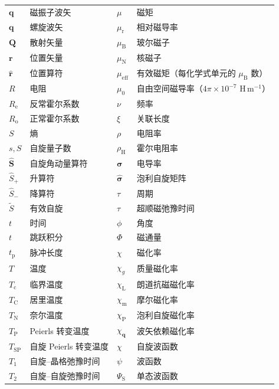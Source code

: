 \begin{center}
\begin{small}
\begin{tabular}{ll@{\hspace{3em}}ll}
\toprule
$\mathbf{q}$ & 磁振子波矢 & $\mu$ & 磁矩\\
$\mathbf{q}$ & 螺旋波矢 & $\mu_{\mathrm{r}}$ & 相对磁导率\\
$\mathbf{Q}$ & 散射矢量 & $\mu_{\mathrm{B}}$ & 玻尔磁子\\
$\mathbf{r}$ & 位置矢量 & $\mu_{\mathrm{N}}$ & 核磁子\\
$\hat{\mathbf{r}}$ & 位置算符 & $\mu_{\mathrm{eff}}$ & 有效磁矩（每化学式单元的 $\mu_{\mathrm{B}}$ 数）\\
$R$ & 电阻 & $\mu_0$ & 自由空间磁导率（$4\pi\times10^{-7}$ H\,m$^{-1}$）\\
$R_{\mathrm{e}}$ & 反常霍尔系数 & $\nu$ & 频率\\
$R_{\mathrm{o}}$ & 正常霍尔系数 & $\xi$ & 关联长度\\
$S$ & 熵 & $\rho$ & 电阻率\\
$s, S$ & 自旋量子数 & $\rho_{\mathrm{H}}$ & 霍尔电阻率\\
$\hat{\mathbf{S}}$ & 自旋角动量算符 & $\boldsymbol{\sigma}$ & 电导率\\
$\hat{S}_{+}$ & 升算符 & $\hat{\boldsymbol{\sigma}}$ & 泡利自旋矩阵\\
$\hat{S}_{-}$ & 降算符 & $\tau$ & 周期\\
$\tilde{S}$ & 有效自旋 & $\tau$ & 超顺磁弛豫时间\\
$t$ & 时间 & $\phi$ & 角度\\
$t$ & 跳跃积分 & $\Phi$ & 磁通量\\
$t_{\mathrm{p}}$ & 脉冲长度 & $\chi$ & 磁化率\\
$T$ & 温度 & $\chi_g$ & 质量磁化率\\
$T_{\mathrm{c}}$ & 临界温度 & $\chi_{\mathrm{L}}$ & 朗道抗磁磁化率\\
$T_{\mathrm{C}}$ & 居里温度 & $\chi_{\mathrm{m}}$ & 摩尔磁化率\\
$T_{\mathrm{N}}$ & 奈尔温度 & $\chi_{\mathrm{P}}$ & 泡利自旋磁化率\\
$T_{\mathrm{P}}$ & Peierls 转变温度 & $\chi_{\mathbf{q}}$ & 波矢依赖磁化率\\
$T_{\mathrm{SP}}$ & 自旋 Peierls 转变温度 & $\chi$ & 自旋波函数\\
$T_1$ & 自旋--晶格弛豫时间 & $\psi$ & 波函数\\
$T_2$ & 自旋--自旋弛豫时间 & $\Psi_{\mathrm{S}}$ & 单态波函数\\

\end{tabular}
\end{small}
\end{center}
